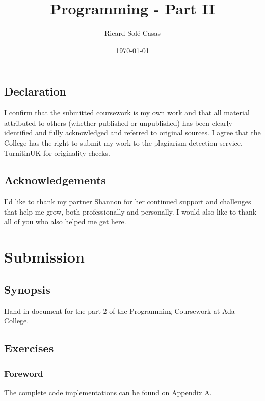 \documentclass[english,a4paper,]{report}
\title{Programming - Part II}
\author{Ricard Solé Casas}
\institute{Google UK \and Ada National College for Digital Skills}
\date{\today}
\begin{document}
\maketitle

\vfill

\section*{Declaration}

I confirm that the submitted coursework is my own work and that all
material attributed to others (whether published or unpublished) has
been clearly identified and fully acknowledged and referred to original
sources. I agree that the College has the right to submit my work to the
plagiarism detection service. TurnitinUK for originality checks.

\section*{Acknowledgements}

I'd like to thank my partner Shannon for her continued support and
challenges that help me grow, both professionally and personally. I
would also like to thank all of you who also helped me get here.

\vfill

{
\setcounter{tocdepth}{2}
\tableofcontents
}
\chapter{Submission}\label{submission}

\section{Synopsis}\label{synopsis}

Hand-in document for the part 2 of the Programming Coursework at Ada
College.

\section{Exercises}\label{exercises}

\subsection{Foreword}\label{foreword}

The complete code implementations can be found on Appendix A.
\end{document}
